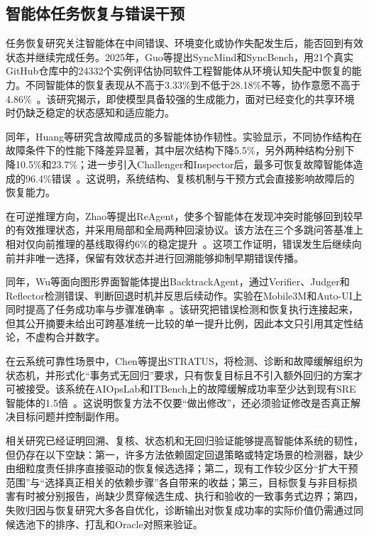 \subsection{智能体任务恢复与错误干预}

任务恢复研究关注智能体在中间错误、环境变化或协作失配发生后，能否回到有效状态并继续完成任务。2025年，Guo等提出SyncMind和SyncBench，用21个真实GitHub仓库中的24332个实例评估协同软件工程智能体从环境认知失配中恢复的能力。不同智能体的恢复表现从不高于3.33\%到不低于28.18\%不等，协作意愿不高于4.86\%~\cite{guo2025syncmind}。该研究揭示，即使模型具备较强的生成能力，面对已经变化的共享环境时仍缺乏稳定的状态感知和适应能力。

同年，Huang等研究含故障成员的多智能体协作韧性。实验显示，不同协作结构在故障条件下的性能下降差异显著，其中层次结构下降5.5\%，另外两种结构分别下降10.5\%和23.7\%；进一步引入Challenger和Inspector后，最多可恢复故障智能体造成的96.4\%错误~\cite{huang2025resilience}。这说明，系统结构、复核机制与干预方式会直接影响故障后的恢复能力。

在可逆推理方向，Zhao等提出ReAgent，使多个智能体在发现冲突时能够回到较早的有效推理状态，并采用局部和全局两种回滚协议。该方法在三个多跳问答基准上相对仅向前推理的基线取得约6\%的稳定提升~\cite{zhao2025reagent}。这项工作证明，错误发生后继续向前并非唯一选择，保留有效状态并进行回溯能够抑制早期错误传播。

同年，Wu等面向图形界面智能体提出BacktrackAgent，通过Verifier、Judger和Reflector检测错误、判断回退时机并反思后续动作。实验在Mobile3M和Auto-UI上同时提高了任务成功率与步骤准确率~\cite{wu2025backtrackagent}。该研究把错误检测和恢复执行连接起来，但其公开摘要未给出可跨基准统一比较的单一提升比例，因此本文只引用其定性结论，不虚构合并数字。

在云系统可靠性场景中，Chen等提出STRATUS，将检测、诊断和故障缓解组织为状态机，并形式化“事务式无回归”要求，只有恢复目标且不引入额外回归的方案才可被接受。该系统在AIOpsLab和ITBench上的故障缓解成功率至少达到现有SRE智能体的1.5倍~\cite{chen2025stratus}。这说明恢复方法不仅要“做出修改”，还必须验证修改是否真正解决目标问题并控制副作用。

相关研究已经证明回溯、复核、状态机和无回归验证能够提高智能体系统的韧性，但仍存在以下空缺：第一，许多方法依赖固定回退策略或特定场景的检测器，缺少由细粒度责任排序直接驱动的恢复候选选择；第二，现有工作较少区分“扩大干预范围”与“选择真正相关的依赖步骤”各自带来的收益；第三，目标恢复与非目标损害有时被分别报告，尚缺少贯穿候选生成、执行和验收的一致事务式边界；第四，失败归因与恢复研究大多各自优化，诊断输出对恢复成功率的实际价值仍需通过同候选池下的排序、打乱和Oracle对照来验证。

